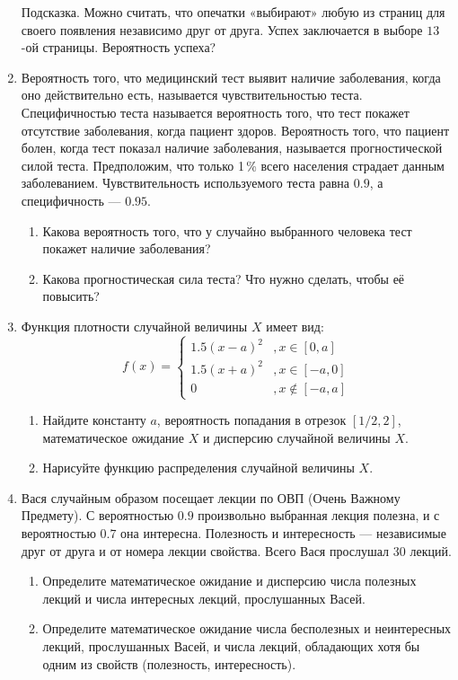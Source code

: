 \documentclass[12pt, a4paper]{article}\usepackage[]{graphicx}\usepackage[]{color}
\begin{document}
\begin{enumerate}
Подсказка.  Можно считать, что опечатки «выбирают» любую из страниц для своего появления независимо друг от друга. Успех заключается в выборе $13$-ой страницы. Вероятность успеха?

\item Вероятность того, что медицинский тест выявит наличие заболевания, когда оно действительно есть, называется чувствительностью теста. Специфичностью теста называется вероятность того, что тест покажет отсутствие заболевания, когда пациент здоров. Вероятность того, что пациент болен, когда тест показал наличие заболевания, называется прогностической силой теста. Предположим, что только 1\,\%  всего населения страдает данным заболеванием.  Чувствительность используемого теста равна $0.9$, а специфичность — $0.95$.
\begin{enumerate}
\item Какова вероятность того, что у случайно выбранного человека тест покажет наличие заболевания?
\item Какова прогностическая сила теста? Что нужно сделать, чтобы её повысить?
\end{enumerate}

\item Функция плотности случайной величины $X$ имеет вид:
\begin{equation*}
f(x) =
 \begin{cases}
   1.5 (x-a)^2 &, x \in [0,a]\\
   1.5 (x+a)^2 &, x \in [-a,0]\\
   0 &, x \not\in [-a,a]
 \end{cases}
\end{equation*}

\begin{enumerate}
\item Найдите константу $a$, вероятность попадания в отрезок $\left[1/2, 2 \right]$, математическое ожидание $X$ и дисперсию случайной величины $X$.
\item Нарисуйте функцию распределения случайной величины $X$.
\end{enumerate}

\item Вася случайным образом посещает лекции по ОВП (Очень Важному Предмету). С вероятностью $0.9$ произвольно выбранная лекция полезна, и с вероятностью $0.7$ она интересна. Полезность и интересность — независимые друг от друга и от номера лекции свойства. Всего Вася прослушал 30 лекций.
\begin{enumerate}
\item Определите математическое ожидание и дисперсию числа полезных лекций и числа интересных лекций, прослушанных Васей.
\item Определите математическое ожидание числа бесполезных и неинтересных лекций, прослушанных Васей, и числа лекций, обладающих хотя бы одним из свойств (полезность,  интересность).
\end{enumerate}


\end{enumerate}
\end{document}
